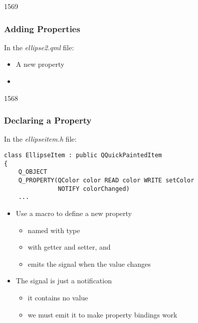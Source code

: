 \begin{slide}[fragile]{1569}\frametitle{Adding Properties}

In the \textit{ellipse2.qml} file:

\medskip

\medskip
\begin{itemize}
\item A new  property
\item[] 
\end{itemize}

\end{slide}

\begin{slide}[fragile]{1568}\frametitle{Declaring a Property}

In the \textit{ellipseitem.h} file:

\vspace*{0.5em}
\begin{lstlisting}
class EllipseItem : public QQuickPaintedItem
{
    Q_OBJECT
    Q_PROPERTY(QColor color READ color WRITE setColor
               NOTIFY colorChanged)
    ...
\end{lstlisting}

\begin{itemize}
\item Use a  macro to define a new property
  \begin{itemize}
  \item named  with  type
  \item with getter and setter,  and 
  \item emits the  signal when the value changes
  \end{itemize}
  \vspace*{0.5em}
\item The signal is just a notification
  \begin{itemize}
  \item it contains no value
  \item we must emit it to make property bindings work
  \end{itemize}
\end{itemize}

\end{slide}

